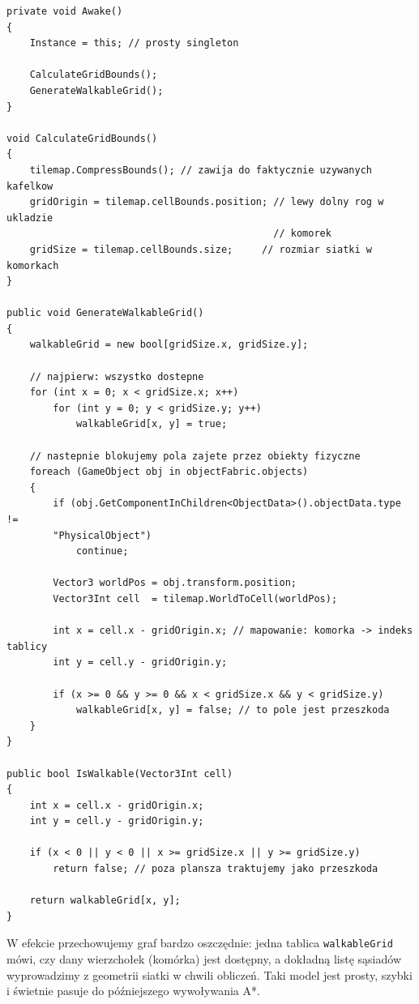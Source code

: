 \documentclass[a4paper,12pt]{book} %
\begin{document}
\begin{lstlisting}[language=CSharp, caption={Budowa siatki przechodnosci na podstawie Tilemap i obiektow}, label={lst:walkablegrid_easy}]
private void Awake()
{
    Instance = this; // prosty singleton

    CalculateGridBounds();
    GenerateWalkableGrid();
}

void CalculateGridBounds()
{
    tilemap.CompressBounds(); // zawija do faktycznie uzywanych kafelkow
    gridOrigin = tilemap.cellBounds.position; // lewy dolny rog w ukladzie
                                              // komorek
    gridSize = tilemap.cellBounds.size;     // rozmiar siatki w komorkach
}

public void GenerateWalkableGrid()
{
    walkableGrid = new bool[gridSize.x, gridSize.y];

    // najpierw: wszystko dostepne
    for (int x = 0; x < gridSize.x; x++)
        for (int y = 0; y < gridSize.y; y++)
            walkableGrid[x, y] = true;

    // nastepnie blokujemy pola zajete przez obiekty fizyczne
    foreach (GameObject obj in objectFabric.objects)
    {
        if (obj.GetComponentInChildren<ObjectData>().objectData.type != 
        "PhysicalObject")
            continue;

        Vector3 worldPos = obj.transform.position;
        Vector3Int cell  = tilemap.WorldToCell(worldPos);

        int x = cell.x - gridOrigin.x; // mapowanie: komorka -> indeks tablicy
        int y = cell.y - gridOrigin.y;

        if (x >= 0 && y >= 0 && x < gridSize.x && y < gridSize.y)
            walkableGrid[x, y] = false; // to pole jest przeszkoda
    }
}

public bool IsWalkable(Vector3Int cell)
{
    int x = cell.x - gridOrigin.x;
    int y = cell.y - gridOrigin.y;

    if (x < 0 || y < 0 || x >= gridSize.x || y >= gridSize.y)
        return false; // poza plansza traktujemy jako przeszkoda

    return walkableGrid[x, y];
}
\end{lstlisting}

W efekcie przechowujemy graf bardzo oszczędnie: jedna tablica \texttt{walkableGrid} mówi, czy dany wierzchołek (komórka) jest dostępny, a dokładną listę sąsiadów wyprowadzimy z geometrii siatki w chwili obliczeń. Taki model jest prosty, szybki i świetnie pasuje do późniejszego wywoływania A*.
\end{document}
